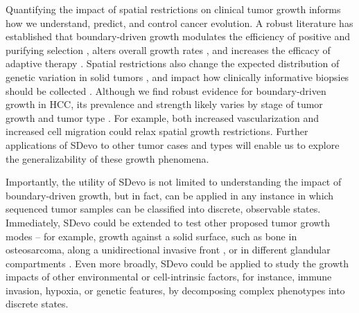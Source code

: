 \documentclass[12pt]{elife_based}
\begin{document}
Quantifying the impact of spatial restrictions on clinical tumor growth informs how we understand, predict, and control cancer evolution. A robust literature has established that boundary-driven growth modulates the efficiency of positive and purifying selection \citep{kayser2019collective, fu2022spatial}, alters overall growth rates \citep{van2019spatiotemporal, colom2020spatial}, and increases the efficacy of adaptive therapy \citep{bacevic2017spatial, strobl2022spatial, fusco2016excess}. Spatial restrictions also change the expected distribution of genetic variation in solid tumors \citep{sun2017between, ahmed2018intratumor, waclaw2015spatial, fu2022spatial}, and impact how clinically informative biopsies should be collected \citep{kostadinov2016}. Although we find robust evidence for boundary-driven growth in HCC, its prevalence and strength likely varies by stage of tumor growth and tumor type \citep{noble2022}. For example, both increased vascularization and increased cell migration could relax spatial growth restrictions. Further applications of SDevo to other tumor cases and types will enable us to explore the generalizability of these growth phenomena.

Importantly, the utility of SDevo is not limited to understanding the impact of boundary-driven growth, but in fact, can be applied in any instance in which sequenced tumor samples can be classified into discrete, observable states. Immediately, SDevo could be extended to test other proposed tumor growth modes -- for example, growth against a solid surface, such as bone in osteosarcoma, along a unidirectional invasive front \citep{Ryser2020}, or in different glandular compartments \citep{West2021}. Even more broadly, SDevo could be applied to study the growth impacts of other environmental or cell-intrinsic factors, for instance, immune invasion, hypoxia, or genetic features, by decomposing complex phenotypes into discrete states.
\end{document}
